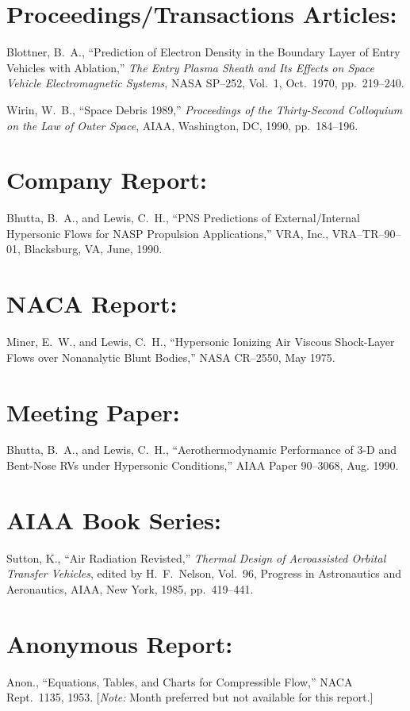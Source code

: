 \documentclass{article}
\begin{document}
\section{Proceedings/Transactions Articles:}
  \cite{blottner:70cp}Blottner, B.~A.,
  ``Prediction of Electron Density in the Boundary Layer of Entry
  Vehicles with Ablation,'' {\itshape The Entry Plasma Sheath and
  Its Effects on Space Vehicle Electromagnetic Systems}, NASA
  SP--252, Vol.~1, Oct.~1970, pp.~219--240.

  \cite{wirin:90cp}Wirin, W.~B., ``Space Debris 1989,'' {\itshape Proceedings
  of the Thirty-Second Colloquium on the Law of Outer Space},
  AIAA, Washington, DC, 1990, pp.~184--196.

\section{Company Report:}
  \cite{bhutta:90vra}Bhutta, B.~A., and Lewis, C.~H.,
  ``PNS Predictions of External/Internal Hypersonic Flows
  for NASP Propulsion Applications,'' VRA, Inc., VRA--TR--90--01,
  Blacksburg, VA, June, 1990.

\section{NACA Report:}
  \cite{miner:75ncr}Miner, E.~W., and Lewis, C.~H.,
  ``Hypersonic Ionizing Air Viscous Shock-Layer Flows over
  Nonanalytic Blunt Bodies,'' NASA CR--2550, May 1975.

\section{Meeting Paper:}
  \cite{bhutta:90cp}Bhutta, B.~A., and Lewis, C.~H.,
  ``Aerothermodynamic Performance of 3-D and Bent-Nose RVs under
  Hypersonic Conditions,'' AIAA Paper 90--3068, Aug. 1990.

\section{AIAA Book Series:}
  \cite{sutton:85ar}Sutton, K., ``Air Radiation
  Revisted,'' {\itshape Thermal Design of Aeroassisted Orbital
  Transfer Vehicles}, edited by H.~F.~Nelson, Vol.~96, Progress
  in Astronautics and Aeronautics, AIAA, New York, 1985,
  pp.~419--441.

\section{Anonymous Report:}
  \cite{anon:53}Anon., ``Equations, Tables, and
  Charts for Compressible Flow,'' NACA Rept.~1135,
  1953. [{\itshape Note:} Month preferred but not available for
  this report.]
\end{document}
